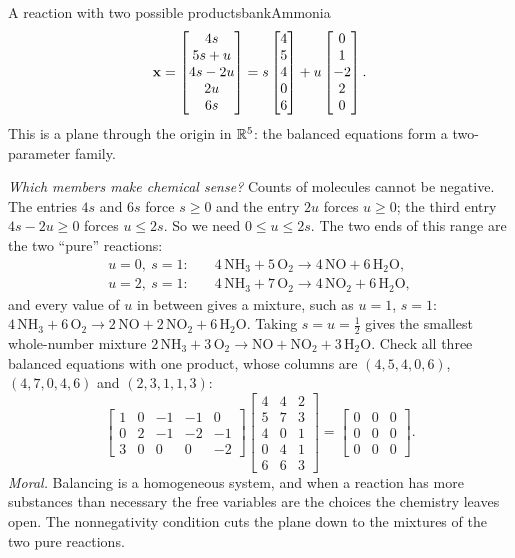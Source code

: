 \documentclass[11pt]{article}
\begin{document}
\begin{exmp}{A reaction with two possible products}{bankAmmonia}
\[\mathbf{x}=\begin{bmatrix}4s\\5s+u\\4s-2u\\2u\\6s\end{bmatrix}=s\begin{bmatrix}4\\5\\4\\0\\6\end{bmatrix}+u\begin{bmatrix}0\\1\\-2\\2\\0\end{bmatrix}.
\]
This is a plane through the origin in $\mathbb{R}^5$: the balanced equations form a two-parameter family.

\emph{Which members make chemical sense?} Counts of molecules cannot be negative. The entries $4s$ and $6s$ force $s\ge0$ and the entry $2u$ forces $u\ge0$; the third entry $4s-2u\ge0$ forces $u\le2s$. So we need $0\le u\le2s$. The two ends of this range are the two ``pure'' reactions:
\begin{align*}
u=0,\ s=1:&\quad 4\,\mathrm{NH_3}+5\,\mathrm{O_2}\to4\,\mathrm{NO}+6\,\mathrm{H_2O},\\
u=2,\ s=1:&\quad 4\,\mathrm{NH_3}+7\,\mathrm{O_2}\to4\,\mathrm{NO_2}+6\,\mathrm{H_2O},
\end{align*}
and every value of $u$ in between gives a mixture, such as $u=1$, $s=1$: \ $4\,\mathrm{NH_3}+6\,\mathrm{O_2}\to2\,\mathrm{NO}+2\,\mathrm{NO_2}+6\,\mathrm{H_2O}$. Taking $s=u=\tfrac12$ gives the smallest whole-number mixture $2\,\mathrm{NH_3}+3\,\mathrm{O_2}\to\mathrm{NO}+\mathrm{NO_2}+3\,\mathrm{H_2O}$. Check all three balanced equations with one product, whose columns are $(4,5,4,0,6)$, $(4,7,0,4,6)$ and $(2,3,1,1,3)$:
\[
\begin{bmatrix}1&0&-1&-1&0\\0&2&-1&-2&-1\\3&0&0&0&-2\end{bmatrix}\begin{bmatrix}4&4&2\\5&7&3\\4&0&1\\0&4&1\\6&6&3\end{bmatrix}=\begin{bmatrix}0&0&0\\0&0&0\\0&0&0\end{bmatrix}.
\]
\emph{Moral.} Balancing is a homogeneous system, and when a reaction has more substances than necessary the free variables are the choices the chemistry leaves open. The nonnegativity condition cuts the plane down to the mixtures of the two pure reactions.
\end{exmp}
\end{document}
